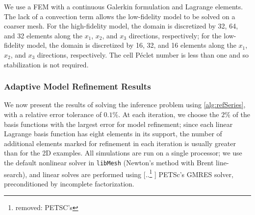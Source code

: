 \documentclass[review]{siamart0516}
\providecommand{\DIFaddtex}[1]{{\protect\color{blue} \sf #1}} %
\providecommand{\DIFdeltex}[1]{{\protect\color{red} [..\footnote{removed: #1} ]}} %
\providecommand{\DIFaddbegin}{} %
\providecommand{\DIFaddend}{} %
\providecommand{\DIFdelbegin}{} %
\providecommand{\DIFdelend}{} %
\providecommand{\DIFadd}[1]{\texorpdfstring{\DIFaddtex{#1}}{#1}} %
\providecommand{\DIFdel}[1]{\texorpdfstring{\DIFdeltex{#1}}{}} %
\newcommand{\DIFscaledelfig}{0.5}
\newlength{\DIFdelgraphicswidth} %
\newlength{\DIFdelgraphicsheight} %
\newcommand{\DIFaddincludegraphics}[2][]{{\color{blue}\fbox{\DIFOincludegraphics[#1]{#2}}}} %
\newcommand{\DIFdelincludegraphics}[2][]{%
\sbox{\DIFdelgraphicsbox}{\DIFOincludegraphics[#1]{#2}}%
\settoboxwidth{\DIFdelgraphicswidth}{\DIFdelgraphicsbox} %
\settoboxtotalheight{\DIFdelgraphicsheight}{\DIFdelgraphicsbox} %
\scalebox{\DIFscaledelfig}{%
\parbox[b]{\DIFdelgraphicswidth}{\usebox{\DIFdelgraphicsbox}\\[-\baselineskip] \rule{\DIFdelgraphicswidth}{0em}}\llap{\resizebox{\DIFdelgraphicswidth}{\DIFdelgraphicsheight}{%
\setlength{\unitlength}{\DIFdelgraphicswidth}%
\begin{picture}(1,1)%
\thicklines\linethickness{2pt} %
{\color[rgb]{1,0,0}\put(0,0){\framebox(1,1){}}}%
{\color[rgb]{1,0,0}\put(0,0){\line( 1,1){1}}}%
{\color[rgb]{1,0,0}\put(0,1){\line(1,-1){1}}}%
\end{picture}%
}\hspace*{3pt}}} %
} %
\DeclareRobustCommand{\DIFaddbegin}{\DIFOaddbegin \let\includegraphics\DIFaddincludegraphics} %
\DeclareRobustCommand{\DIFaddend}{\DIFOaddend \let\includegraphics\DIFOincludegraphics} %
\DeclareRobustCommand{\DIFdelbegin}{\DIFOdelbegin \let\includegraphics\DIFdelincludegraphics} %
\DeclareRobustCommand{\DIFdelend}{\DIFOaddend \let\includegraphics\DIFOincludegraphics} %
\begin{document}
We use a FEM with a continuous Galerkin formulation and Lagrange elements. The lack of a convection term allows the low-fidelity model to be solved on a coarser mesh. For the high-fidelity model, the domain is discretized by 32, 64, and 32 elements along the $x_1$, $x_2$, and $x_3$ directions, respectively; for the low-fidelity model, the domain is discretized by 16, 32, and 16 elements along the $x_1$, $x_2$, and $x_3$ directions, respectively. The cell P\'{e}clet number is less than one and so stabilization is not required.

\subsubsection{Adaptive Model Refinement Results} \label{sec:ref3D_diffmesh}

We now present the results of solving the inference problem using \cref{alg:refSeries}, with a relative error tolerance of $0.1\%$. At each iteration, we choose the $2\%$ of the basis functions with the largest error for model refinement; since each linear Lagrange basis function has eight elements in its support, the number of additional elements marked for refinement in each iteration is usually greater than for the 2D examples. All simulations are run on a single processor; we use the default nonlinear solver in \texttt{libMesh} \DIFaddbegin \DIFadd{\cite{libMeshPaper} }\DIFaddend (Newton's method with Brent line-search), and linear solves are performed using \DIFdelbegin \DIFdel{PETSC's }\DIFdelend \DIFaddbegin \DIFadd{PETSc's \cite{petsc-user-ref} }\DIFaddend GMRES solver, preconditioned by incomplete factorization.
\end{document}
